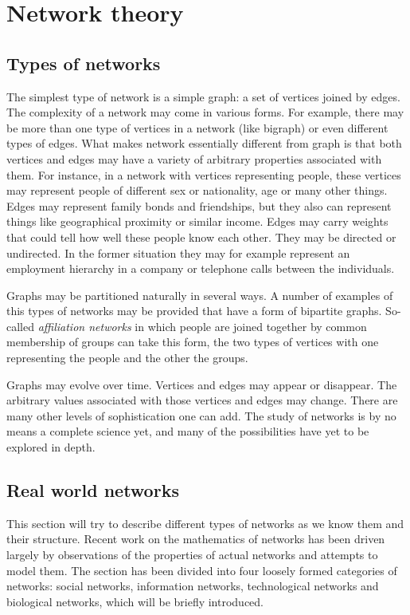 \chapter{Network theory}

  \section{Types of networks}
    
    The simplest type of network is a simple graph: a set of vertices joined by edges. The complexity of a network may come in various forms. For example, there may be more than one type of vertices in a network (like bigraph) or even different types of edges. What makes network essentially different from graph is that both vertices and edges may have a variety of arbitrary properties associated with them. For instance, in a network with vertices representing people, these vertices may represent people of different sex or nationality, age or many other things. Edges may represent family bonds and friendships, but they also can represent things like geographical proximity or similar income. Edges may carry weights that could tell how well these people know each other. They may be directed or undirected. In the former situation they may for example represent an employment hierarchy in a company or telephone calls between the individuals.
    
    Graphs may be partitioned naturally in several ways. A number of examples of this types of networks may be provided that have a form of bipartite graphs. So-called \emph{affiliation networks} in which people are joined together by common membership of groups can take this form, the two types of vertices with one representing the people and the other the groups.
    
    Graphs may evolve over time. Vertices and edges may appear or disappear. The arbitrary values associated with those vertices and edges may change. There are many other levels of sophistication one can add. The study of networks is by no means a complete science yet, and many of the possibilities have yet to be explored in depth.

  \section{Real world networks}

    This section will try to describe different types of networks as we know them and their structure. Recent work on the mathematics of networks has been driven largely by observations of the properties of actual networks and attempts to model them. The section has been divided into four loosely formed categories of networks: social networks, information networks, technological networks and biological networks, which will be briefly introduced.

